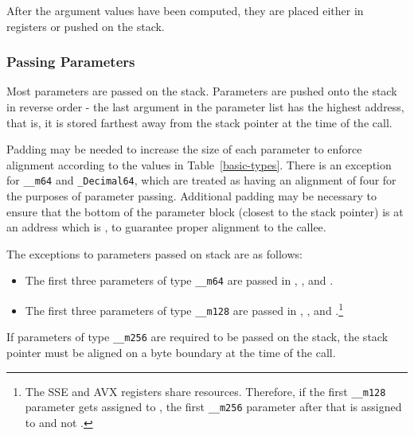 After the argument values have been computed, they are placed either in
registers or pushed on the stack.

\subsubsection{Passing Parameters}

Most parameters are passed on the stack. Parameters are pushed onto the
stack in reverse order - the last argument in the parameter list has the
highest address, that is, it is stored farthest away from the stack pointer
at the time of the call.

Padding may be needed to increase the size of each parameter to enforce
alignment according to the values in Table~\ref{basic-types}.  There is
an exception for \texttt{__m64} and \texttt{_Decimal64}, which are treated
as having an
alignment of four for the purposes of parameter passing.  Additional
padding may be necessary to ensure that the bottom of the parameter block
(closest to the stack pointer) is at an address which is ,
to guarantee proper alignment to the callee.

The exceptions to parameters passed on stack are as follows:
\begin{itemize}
  \item The first three parameters of type \texttt{__m64} are passed in
	, , and .
  \item The first three parameters of type \texttt{__m128} are passed in
	, , and .\footnote{The SSE and AVX
	registers share resources. Therefore, if the first \texttt{__m128}
	parameter gets assigned to  , the first \texttt{__m256}
	parameter after that is assigned to  and not
	.}
\end{itemize}

If parameters of type \texttt{__m256} are required to be passed on the
stack, the stack pointer must be aligned on a  byte boundary
at the time of the call.

